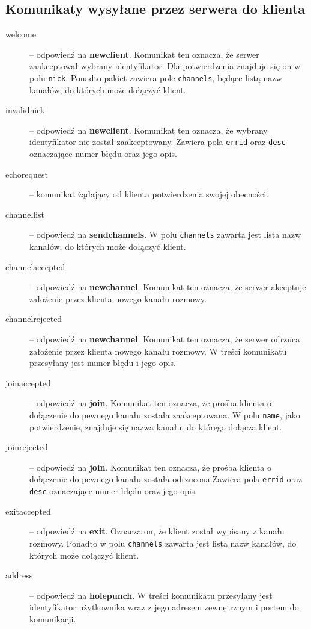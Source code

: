 \documentclass[a4paper, 10pt]{article}
\begin{document}
\subsection{Komunikaty wysyłane przez serwera do klienta}
\begin{description}
 \item[welcome] -- odpowiedź na \textbf{newclient}. Komunikat ten oznacza, że serwer zaakceptował wybrany identyfikator. Dla potwierdzenia znajduje się on w polu \texttt{nick}. Ponadto pakiet zawiera pole \texttt{channels}, będące listą nazw kanałów, do których może dołączyć klient. 
 \item[invalidnick] -- odpowiedź na \textbf{newclient}. Komunikat ten oznacza, że wybrany identyfikator nie został zaakceptowany. Zawiera pola \texttt{errid} oraz \texttt{desc} oznaczające numer błędu oraz jego opis.
 \item[echorequest] -- komunikat żądający od klienta potwierdzenia swojej obecności.
 \item[channellist] -- odpowiedź na \textbf{sendchannels}. W polu \texttt{channels} zawarta jest lista nazw kanałów, do których może dołączyć klient.
 \item[channelaccepted] -- odpowiedź na \textbf{newchannel}. Komunikat ten oznacza, że serwer akceptuje założenie przez klienta nowego kanału rozmowy.
  \item[channelrejected] -- odpowiedź na \textbf{newchannel}. Komunikat ten oznacza, że serwer odrzuca założenie przez klienta nowego kanału rozmowy. W treści komunikatu przesyłany jest numer błędu i jego opis.
 \item[joinaccepted] -- odpowiedź na \textbf{join}. Komunikat ten oznacza, że prośba klienta o dołączenie do pewnego kanału została zaakceptowana. W polu \texttt{name}, jako potwierdzenie, znajduje się nazwa kanału, do którego dołącza klient.
  \item[joinrejected] -- odpowiedź na \textbf{join}. Komunikat ten oznacza, że prośba klienta o dołączenie do pewnego kanału została odrzucona.Zawiera pola \texttt{errid} oraz \texttt{desc} oznaczające numer błędu oraz jego opis.
 \item[exitaccepted] -- odpowiedź na \textbf{exit}. Oznacza on, że klient został wypisany z kanału rozmowy. Ponadto w polu \texttt{channels} zawarta jest lista nazw kanałów, do których może dołączyć klient.
 \item[address] -- odpowiedź na \textbf{holepunch}. W treści komunikatu przesyłany jest identyfikator użytkownika wraz z jego adresem zewnętrznym i portem do komunikacji.

\end{description}
\end{document}
